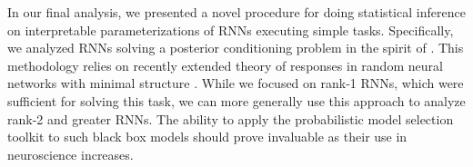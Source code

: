 \documentclass[11pt]{article}
\begin{document}

In our final analysis, we presented a novel procedure for doing statistical inference on interpretable parameterizations of RNNs executing simple tasks. 
Specifically, we analyzed RNNs solving a posterior conditioning problem in the spirit of \cite{echeveste2019cortical}. 
This methodology relies on recently extended theory of responses in random neural networks with minimal structure \cite{mastrogiuseppe2018linking}. 
While we focused on rank-1 RNNs, which were sufficient for solving this task, we can more generally use this approach to analyze rank-2 and greater RNNs.
The ability to apply the probabilistic model selection toolkit to such black box models should prove invaluable as their use in neuroscience increases.

\end{document}
